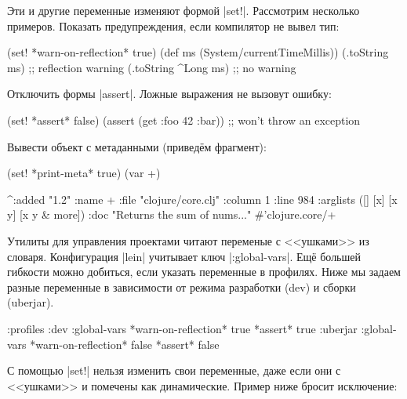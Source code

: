 Эти и другие переменные изменяют формой \spverb|set!|. Рассмотрим несколько
примеров. Показать предупреждения, если компилятор не вывел тип:

\begin{english}
  \begin{clojure}
(set! *warn-on-reflection* true)
(def ms (System/currentTimeMillis))
(.toString ms)       ;; reflection warning
(.toString ^Long ms) ;; no warning
  \end{clojure}
\end{english}

\noindent
Отключить формы \spverb|assert|. Ложные выражения не вызовут ошибку:

\begin{english}
  \begin{clojure}
(set! *assert* false)
(assert (get {:foo 42} :bar))
;; won't throw an exception
  \end{clojure}
\end{english}

\noindent
Вывести объект с метаданными (приведём фрагмент):

\begin{english}
  \begin{clojure}
(set! *print-meta* true)
(var +)

^{:added "1.2"
  :name +
  :file "clojure/core.clj"
  :column 1
  :line 984
  :arglists ([] [x] [x y] [x y & more])
  :doc "Returns the sum of nums..."}
#'clojure.core/+
  \end{clojure}
\end{english}


Утилиты для управления проектами читают переменые с <<ушками>> из
словаря. Конфигурация \spverb|lein| учитывает ключ \spverb|:global-vars|. Ещ\"{е}
большей гибкости можно добиться, если указать переменные в профилях. Ниже мы
задаем разные переменные в зависимости от режима разработки (dev) и сборки
(uberjar).

\begin{english}
  \begin{clojure}
{:profiles
 :dev {:global-vars {*warn-on-reflection* true
                     *assert* true}}
 :uberjar {:global-vars {*warn-on-reflection* false
                         *assert* false}}}
  \end{clojure}
\end{english}

С помощью \spverb|set!| нельзя изменить свои переменные, даже если они с
<<ушками>> и помечены как динамические. Пример ниже бросит исключение:

